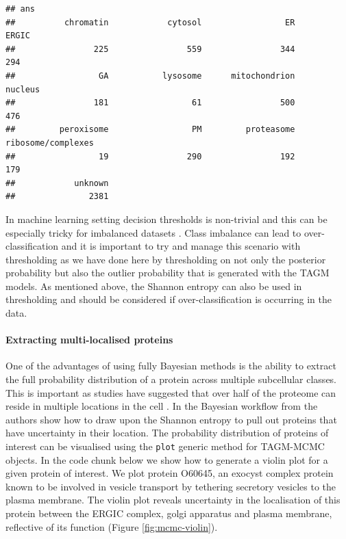 \documentclass[9pt,a4paper,]{extarticle}
\begin{document}
\begin{verbatim}
## ans
##          chromatin            cytosol                 ER              ERGIC 
##                225                559                344                294 
##                 GA           lysosome      mitochondrion            nucleus 
##                181                 61                500                476 
##         peroxisome                 PM         proteasome ribosome/complexes 
##                 19                290                192                179 
##            unknown 
##               2381
\end{verbatim}

In machine learning setting decision thresholds is non-trivial and this can
be especially tricky for imbalanced datasets \citep{Chen2024}. Class imbalance
can lead to over-classification and it is important to try and manage this
scenario with thresholding as we have done here by thresholding on not only
the posterior probability but also the outlier probability that is generated
with the TAGM models. As mentioned above, the Shannon entropy can also be
used in thresholding and should be considered if over-classification is
occurring in the data.

\paragraph{Extracting multi-localised proteins}\label{extracting-multi-localised-proteins}

One of the advantages of using fully Bayesian methods is the ability to extract
the full probability distribution of a protein across multiple subcellular classes.
This is important as studies have suggested that over half of the proteome can reside in
multiple locations in the cell \citep{Thul2017}. In the Bayesian workflow from \citet{Crook2019}
the authors show how to draw upon the Shannon entropy to pull out proteins that
have uncertainty in their location. The probability distribution of proteins of
interest can be visualised using the \texttt{plot} generic method for
TAGM-MCMC objects. In the code chunk below we show how to generate a violin plot
for a given protein of interest. We plot protein O60645, an
exocyst complex protein known to be involved in vesicle transport by tethering
secretory vesicles to the plasma membrane. The violin plot reveals uncertainty
in the localisation of this protein between the ERGIC complex, golgi apparatus
and plasma membrane, reflective of its function (Figure \ref{fig:mcmc-violin}).
\end{document}
